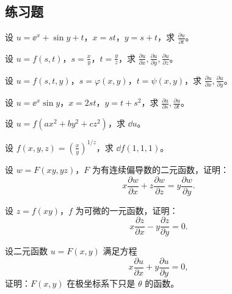 \subsection{练习题}

\begin{xexercise}[1]
设 $u=\ee^x+\sin y+t$，$x=st$，$y=s+t$，求 $\frac{\partial u}{\partial t}$。
\end{xexercise}

\begin{xexercise}[2]
设 $u=f(s,t)$，$s=\frac{x}{y}$，$t=\frac{y}{z}$，求 $\frac{\partial u}{\partial x},\frac{\partial u}{\partial y},\frac{\partial u}{\partial z}$。
\end{xexercise}

\begin{xexercise}[3]
设 $u=f(s,t,y)$，$s=\varphi(x,y)$，$t=\psi(x,y)$，求 $\frac{\partial u}{\partial x},\frac{\partial u}{\partial y}$。
\end{xexercise}

\begin{xexercise}[4]
设 $u=\ee^x\sin y$，$x=2st$，$y=t+s^2$，求 $\frac{\partial u}{\partial s},\frac{\partial u}{\partial t}$。
\end{xexercise}

\begin{xexercise}[5]
设 $u=f(ax^2+by^2+cz^2)$，求 $\dd u$。
\end{xexercise}

\begin{xexercise}[6]
设 $f(x,y,z)=\left(\frac xy\right)^{1/z}$，求 $\dd f(1,1,1)$。
\end{xexercise}

\begin{xexercise}[7]
设 $w=F(xy,yz)$，$F$ 为有连续偏导数的二元函数，证明：
  \[
    x\frac{\partial w}{\partial x}+z\frac{\partial w}{\partial z}=y\frac{\partial w}{\partial y}.
  \]
\end{xexercise}

\begin{xexercise}[8]
设 $z=f(xy)$，$f$ 为可微的一元函数，证明：
  \[
    x\frac{\partial z}{\partial x}-y\frac{\partial z}{\partial y}=0.
  \]
\end{xexercise}

\begin{xexercise}[9]
设二元函数 $u=F(x,y)$ 满足方程
  \[
    x\frac{\partial u}{\partial x}+y\frac{\partial u}{\partial y}=0,
  \]
  证明：$F(x,y)$ 在极坐标系下只是 $\theta$ 的函数。
\end{xexercise}

